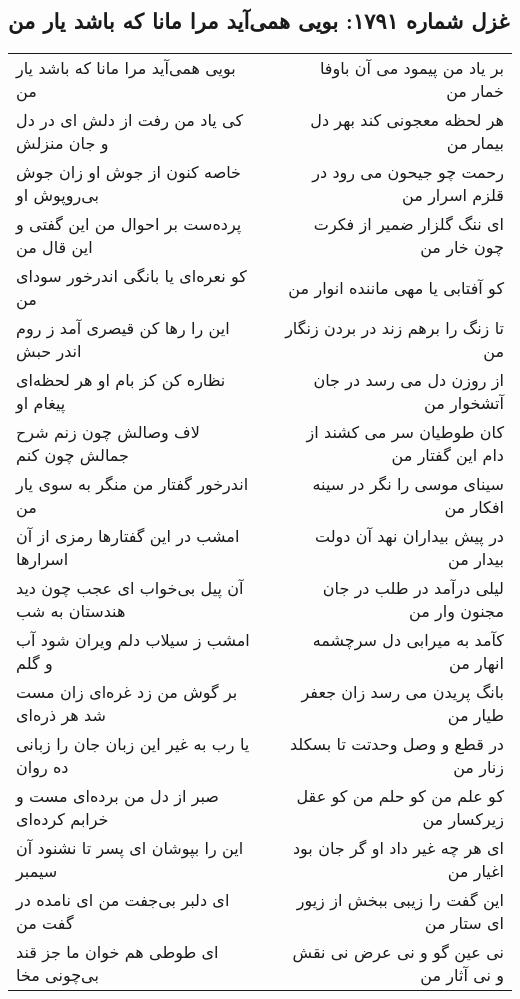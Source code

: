 \begin{center}
\section*{غزل شماره ۱۷۹۱: بویی همی‌آید مرا مانا که باشد یار من}
\label{sec:1791}
\begin{longtable}{l p{0.5cm} r}
بویی همی‌آید مرا مانا که باشد یار من
&&
بر یاد من پیمود می آن باوفا خمار من
\\
کی یاد من رفت از دلش ای در دل و جان منزلش
&&
هر لحظه معجونی کند بهر دل بیمار من
\\
خاصه کنون از جوش او زان جوش بی‌روپوش او
&&
رحمت چو جیحون می رود در قلزم اسرار من
\\
پرده‌ست بر احوال من این گفتی و این قال من
&&
ای ننگ گلزار ضمیر از فکرت چون خار من
\\
کو نعره‌ای یا بانگی اندرخور سودای من
&&
کو آفتابی یا مهی ماننده انوار من
\\
این را رها کن قیصری آمد ز روم اندر حبش
&&
تا زنگ را برهم زند در بردن زنگار من
\\
نظاره کن کز بام او هر لحظه‌ای پیغام او
&&
از روزن دل می رسد در جان آتشخوار من
\\
لاف وصالش چون زنم شرح جمالش چون کنم
&&
کان طوطیان سر می کشند از دام این گفتار من
\\
اندرخور گفتار من منگر به سوی یار من
&&
سینای موسی را نگر در سینه افکار من
\\
امشب در این گفتارها رمزی از آن اسرارها
&&
در پیش بیداران نهد آن دولت بیدار من
\\
آن پیل بی‌خواب ای عجب چون دید هندستان به شب
&&
لیلی درآمد در طلب در جان مجنون وار من
\\
امشب ز سیلاب دلم ویران شود آب و گلم
&&
کآمد به میرابی دل سرچشمه انهار من
\\
بر گوش من زد غره‌ای زان مست شد هر ذره‌ای
&&
بانگ پریدن می رسد زان جعفر طیار من
\\
یا رب به غیر این زبان جان را زبانی ده روان
&&
در قطع و وصل وحدتت تا بسکلد زنار من
\\
صبر از دل من برده‌ای مست و خرابم کرده‌ای
&&
کو علم من کو حلم من کو عقل زیرکسار من
\\
این را بپوشان ای پسر تا نشنود آن سیمبر
&&
ای هر چه غیر داد او گر جان بود اغیار من
\\
ای دلبر بی‌جفت من ای نامده در گفت من
&&
این گفت را زیبی ببخش از زیور ای ستار من
\\
ای طوطی هم خوان ما جز قند بی‌چونی مخا
&&
نی عین گو و نی عرض نی نقش و نی آثار من
\\

\end{longtable}
\end{center}
